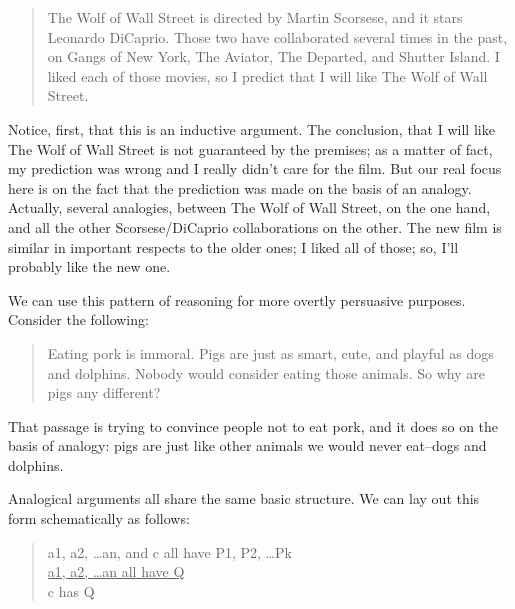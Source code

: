 \begin{quote}
The Wolf of Wall Street is directed by Martin Scorsese, and it stars Leonardo DiCaprio.
Those two have collaborated several times in the past, on Gangs of New York, The Aviator,
The Departed, and Shutter Island. I liked each of those movies, so I predict that I will like
The Wolf of Wall Street.
\end{quote}

Notice, first, that this is an inductive argument. The conclusion, that I will like The Wolf of Wall
Street is not guaranteed by the premises; as a matter of fact, my prediction was wrong and I really
didn't care for the film. But our real focus here is on the fact that the prediction was made on the
basis of an analogy. Actually, several analogies, between The Wolf of Wall Street, on the one hand,
and all the other Scorsese/DiCaprio collaborations on the other. The new film is similar in
important respects to the older ones; I liked all of those; so, I'll probably like the new one.

We can use this pattern of reasoning for more overtly persuasive purposes. Consider the following:

\begin{quote}
Eating pork is immoral. Pigs are just as smart, cute, and playful as dogs and dolphins.
Nobody would consider eating those animals. So why are pigs any different?
\end{quote}

That passage is trying to convince people not to eat pork, and it does so on the basis of analogy:
pigs are just like other animals we would never eat--dogs and dolphins.

Analogical arguments all share the same basic structure. We can lay out this form schematically
as follows:

\begin{quote}
a1, a2, \dots an, and c all have P1, P2, \dots Pk \\
\underline{a1, a2, \dots an all have Q} \\
c has Q \\
\end{quote}

